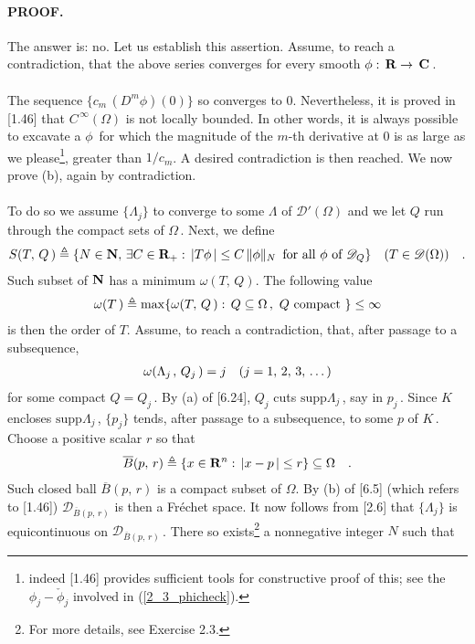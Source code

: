 \paragraph{PROOF.} The answer is: no. Let us establish this assertion. Assume, to reach a contradiction, that the above series converges for every smooth $\phi:\, {\mathbf R}\to\,{\mathbf C}\,$. \\
\\
The sequence $\{c_m\, (D^m\phi)(0)\}$ so converges to $0$. Nevertheless, it is proved in [1.46] that $C^{\,\infty}(\Omega)$ is not locally bounded. In other words, it is always possible to excavate a $\phi\,$ for which the magnitude of the $m$-th derivative at $0$ is as large as we please\footnote{indeed [1.46] provides sufficient tools for constructive proof of this; see the $\phi_j-\check{\phi}_j$ involved in (\ref{2_3_phicheck}).}, \eg greater than $1/c_m$.
 A desired contradiction is then reached. We now prove (b), again by contradiction.\\
\\
To do so we assume $\{\Lambda_j\}$ to converge to some $\Lambda$ of $\mathscr{D}'(\Omega)$ and we let $Q$ run through the compact sets of $\Omega\,$. Next, we define
\begin{align}{\label{6_6_1}
S(T,\, Q\,)\triangleq\{N\in {\mathbf N}, \, \exists C\in {\mathbf R}_+:\, \lvert T\phi\, \rvert \leq C\, \| \phi \|_N \,\text{ for all }\phi \text{ of } \mathscr{D}_Q \}\quad (T\in \mathscr{D}(\Omega))\quad .
}\end{align}
Such subset of ${\mathbf N}$ has a minimum $\omega(T,\, Q)$. The following value
\begin{align}{\label{6_6_2}
\omega (T\,) \triangleq\max\{ \omega(T,\, Q\,): \, Q\subseteq \Omega\, , \,\, Q \text{ compact }\}\leq \infty
}\end{align}
is then the order of $T$. Assume, to reach a contradiction, that, after passage to a subsequence,
\begin{align}{\label{6_6_3}
\omega (\Lambda_{j\,},\, Q_j\,) =j\quad (j=1,\, 2,\, 3,\, \dots)
}\end{align}
for some compact $Q=Q_j\,$. By (a) of [6.24], $Q_j$ cuts $\text{supp}\Lambda_j\,$, say in $p_j\,$. Since $K$ encloses $\text{supp}\Lambda_j\,$, $\{p_j\}$ tends, after passage to a subsequence, to some $p$ of $K\,$.
Choose a positive scalar $r$ so that 
\begin{align}{\label{6_6_5}
\overline{B}(p,\, r)\triangleq\{ x\in {\mathbf R}^n:\, \lvert x-p\,\rvert\leq r\}\subseteq \Omega \quad .
}\end{align}
Such closed ball $\overline{B}(p,\, r)$ is a compact subset of $\Omega$. By (b) of [6.5] (which refers to [1.46])  $\mathscr{D}_{\overline{B}(p,\, r)}$ is then a Fréchet space. It now follows from [2.6] that $\{\Lambda_j\}$ is equicontinuous on $\mathscr{D}_{\overline{B}(p,\, r)}\,$. There so exists\footnote{For more details, see Exercise 2.3.} a nonnegative integer $N$ such that 
